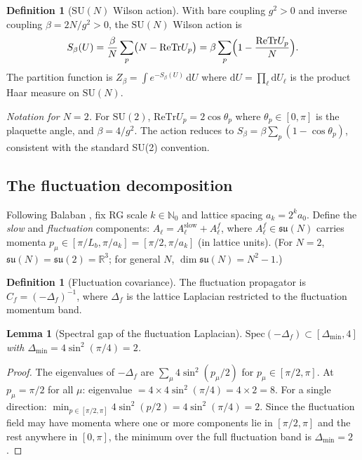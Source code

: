 \documentclass[11pt,a4paper]{amsart}
\newtheorem{lemma}[theorem]{Lemma}
\theoremstyle{definition}
\newtheorem{definition}[theorem]{Definition}
\newcommand{\SU}{\mathrm{SU}}
\newcommand{\su}{\mathfrak{su}}
\newcommand{\R}{\mathbb{R}}
\newcommand{\N}{\mathbb{N}}
\newcommand{\re}{\mathrm{Re}}
\newcommand{\Tr}{\mathrm{Tr}}
\newcommand{\Del}{\Delta_{\min}}
\newcommand{\Cf}{C_f}
\begin{document}
\begin{definition}[$\SU(N)$ Wilson action]
\label{def:WilsonSUN}
With bare coupling $g^2 > 0$ and inverse coupling $\beta = 2N/g^2 > 0$,
the $\SU(N)$ Wilson action is
\begin{equation}
\label{eq:Wilson_SUN}
  S_\beta(U)
  = \frac{\beta}{N}\sum_{p} \bigl(N - \re\Tr U_p\bigr)
  = \beta\sum_p \Bigl(1 - \frac{\re\Tr U_p}{N}\Bigr).
\end{equation}
The partition function is $Z_\beta = \int e^{-S_\beta(U)}\,\mathrm{d}U$
where $\mathrm{d}U = \prod_\ell \mathrm{d}U_\ell$ is the product Haar measure on $\SU(N)$.

\noindent\emph{Notation for $N=2$.}
For $\SU(2)$, $\re\Tr U_p = 2\cos\theta_p$ where $\theta_p\in[0,\pi]$
is the plaquette angle, and $\beta = 4/g^2$.
The action reduces to $S_\beta = \beta\sum_p(1-\cos\theta_p)$,
consistent with the standard SU(2) convention.
\end{definition}

\subsection{The fluctuation decomposition}

Following Balaban \cite{B85}, fix RG scale $k\in\N_0$ and lattice spacing
$a_k = 2^k a_0$.
Define the \emph{slow} and \emph{fluctuation} components:
$A_\ell = A^{\mathrm{slow}}_\ell + A^f_\ell$,
where $A^f_\ell\in\su(N)$ carries momenta $p_\mu\in[\pi/L_b, \pi/a_k]
= [\pi/2, \pi/a_k]$ (in lattice units).
(For $N=2$, $\su(N)=\su(2)=\R^3$; for general $N$, $\dim\su(N) = N^2-1$.)

\begin{definition}[Fluctuation covariance]
The fluctuation propagator is $\Cf = (-\Delta_f)^{-1}$,
where $\Delta_f$ is the lattice Laplacian restricted to the fluctuation
momentum band.
\end{definition}

\begin{lemma}[Spectral gap of the fluctuation Laplacian]
\label{lem:gap}
$\mathrm{Spec}(-\Delta_f) \subset [\Del, 4]$ with
$\Del = 4\sin^2(\pi/4) = 2$.
\end{lemma}
\begin{proof}
The eigenvalues of $-\Delta_f$ are $\sum_\mu 4\sin^2(p_\mu/2)$ for
$p_\mu\in[\pi/2, \pi]$.
At $p_\mu = \pi/2$ for all $\mu$: eigenvalue $= 4\times 4\sin^2(\pi/4) = 4\times 2 = 8$.
For a single direction: $\min_{p\in[\pi/2,\pi]} 4\sin^2(p/2)
= 4\sin^2(\pi/4) = 2$.
Since the fluctuation field may have momenta where one or more components
lie in $[\pi/2,\pi]$ and the rest anywhere in $[0,\pi]$,
the minimum over the full fluctuation band is $\Del = 2$.
\end{proof}
\end{document}
